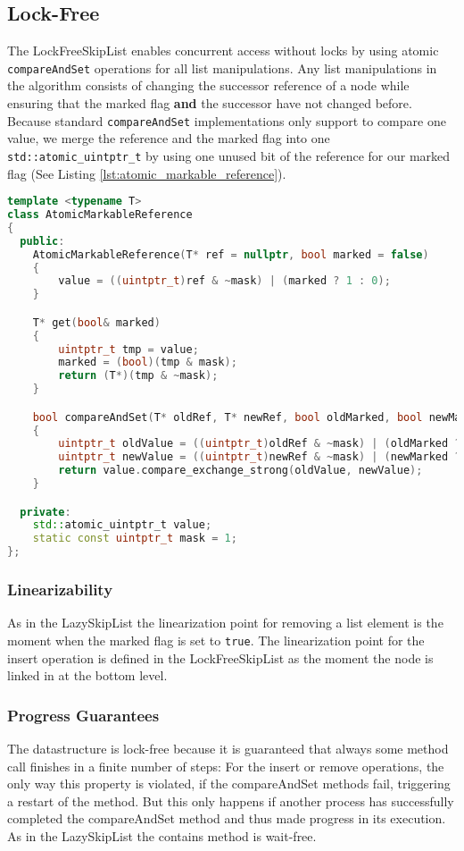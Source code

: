 \subsection{Lock-Free}
The LockFreeSkipList enables concurrent access without locks by using atomic \texttt{compareAndSet} operations for all list manipulations. Any list manipulations in the algorithm consists of changing the successor reference of a node while ensuring that the marked flag \textbf{and} the successor have not changed before. Because standard \texttt{compareAndSet} implementations only support to compare one value, we merge the reference and the marked flag into one \texttt{std::atomic\_uintptr\_t} by using one unused bit of the reference for our marked flag (See Listing \ref{lst:atomic_markable_reference}).

\begin{lstlisting}[language=C++, caption={AtomicMarkableReference}, label=lst:atomic_markable_reference]
template <typename T>
class AtomicMarkableReference
{
  public:
    AtomicMarkableReference(T* ref = nullptr, bool marked = false)
    {
        value = ((uintptr_t)ref & ~mask) | (marked ? 1 : 0);
    }

    T* get(bool& marked)
    {
        uintptr_t tmp = value;
        marked = (bool)(tmp & mask);
        return (T*)(tmp & ~mask);
    }

    bool compareAndSet(T* oldRef, T* newRef, bool oldMarked, bool newMarked)
    {
        uintptr_t oldValue = ((uintptr_t)oldRef & ~mask) | (oldMarked ? 1 : 0);
        uintptr_t newValue = ((uintptr_t)newRef & ~mask) | (newMarked ? 1 : 0);
        return value.compare_exchange_strong(oldValue, newValue);
    }

  private:
    std::atomic_uintptr_t value;
    static const uintptr_t mask = 1;
};
\end{lstlisting}

\subsubsection*{Linearizability}
\noindent As in the LazySkipList the linearization point for removing a list element is the moment when the marked flag is set to \texttt{true}. The linearization point for the insert operation is defined in the LockFreeSkipList as the moment the node is linked in at the bottom level.

\subsubsection*{Progress Guarantees}
The datastructure is lock-free because it is guaranteed that always some method call finishes in a finite number of steps: For the insert or remove operations, the only way this property is violated, if the compareAndSet methods fail, triggering a restart of the method. But this only happens if another process has successfully completed the compareAndSet method and thus made progress in its execution.\\
As in the LazySkipList the contains method is wait-free.


